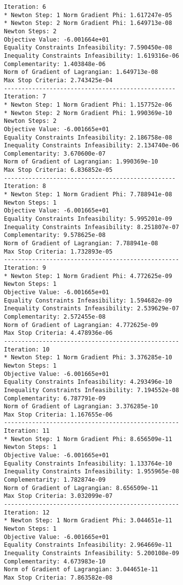 \documentclass{article}
\begin{document}
\begin{minipage}[t]{0.45\textwidth}
\begin{verbatim}
Iteration: 6
* Newton Step: 1 Norm Gradient Phi: 1.617247e-05
* Newton Step: 2 Norm Gradient Phi: 1.649713e-08
Newton Steps: 2
Objective Value: -6.001664e+01
Equality Constraints Infeasibility: 7.590450e-08
Inequality Constraints Infeasibility: 1.619316e-06
Complementarity: 1.403848e-06
Norm of Gradient of Lagrangian: 1.649713e-08
Max Stop Criteria: 2.743425e-04
-------------------------------------------------
Iteration: 7
* Newton Step: 1 Norm Gradient Phi: 1.157752e-06
* Newton Step: 2 Norm Gradient Phi: 1.990369e-10
Newton Steps: 2
Objective Value: -6.001665e+01
Equality Constraints Infeasibility: 2.186758e-08
Inequality Constraints Infeasibility: 2.134740e-06
Complementarity: 3.670600e-07
Norm of Gradient of Lagrangian: 1.990369e-10
Max Stop Criteria: 6.836852e-05
-------------------------------------------------
Iteration: 8
* Newton Step: 1 Norm Gradient Phi: 7.788941e-08
Newton Steps: 1
Objective Value: -6.001665e+01
Equality Constraints Infeasibility: 5.995201e-09
Inequality Constraints Infeasibility: 8.251807e-07
Complementarity: 9.578625e-08
Norm of Gradient of Lagrangian: 7.788941e-08
Max Stop Criteria: 1.732893e-05
--------------------------------------------------
Iteration: 9
* Newton Step: 1 Norm Gradient Phi: 4.772625e-09
Newton Steps: 1
Objective Value: -6.001665e+01
Equality Constraints Infeasibility: 1.594682e-09
Inequality Constraints Infeasibility: 2.539629e-07
Complementarity: 2.572455e-08
Norm of Gradient of Lagrangian: 4.772625e-09
Max Stop Criteria: 4.478936e-06
--------------------------------------------------
Iteration: 10
* Newton Step: 1 Norm Gradient Phi: 3.376285e-10
Newton Steps: 1
Objective Value: -6.001665e+01
Equality Constraints Infeasibility: 4.293496e-10
Inequality Constraints Infeasibility: 7.194552e-08
Complementarity: 6.787791e-09
Norm of Gradient of Lagrangian: 3.376285e-10
Max Stop Criteria: 1.167655e-06
--------------------------------------------------
Iteration: 11
* Newton Step: 1 Norm Gradient Phi: 8.656509e-11
Newton Steps: 1
Objective Value: -6.001665e+01
Equality Constraints Infeasibility: 1.133764e-10
Inequality Constraints Infeasibility: 1.955965e-08
Complementarity: 1.782874e-09
Norm of Gradient of Lagrangian: 8.656509e-11
Max Stop Criteria: 3.032099e-07
--------------------------------------------------
Iteration: 12
* Newton Step: 1 Norm Gradient Phi: 3.044651e-11
Newton Steps: 1
Objective Value: -6.001665e+01
Equality Constraints Infeasibility: 2.964669e-11
Inequality Constraints Infeasibility: 5.200108e-09
Complementarity: 4.673983e-10
Norm of Gradient of Lagrangian: 3.044651e-11
Max Stop Criteria: 7.863582e-08
\end{verbatim}
\end{minipage}
\end{document}
